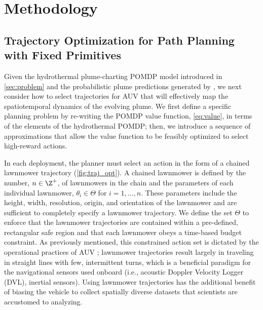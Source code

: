 \section{Methodology}
\subsection{Trajectory Optimization for Path Planning with Fixed Primitives}
\label{sec:to}
Given the hydrothermal plume-charting POMDP model introduced in \cref{sec:problem} and the probabilistic plume predictions generated by \PHUMES, we next consider how to select trajectories for AUV \Sentry that will effectively map the spatiotemporal dynamics of the evolving plume.  We first define a specific planning problem by re-writing the POMDP value function, \cref{eq:value}, in terms of the elements of the hydrothermal POMDP; then, we introduce a sequence of approximations that allow the value function to be feasibly optimized to select high-reward actions.

In each deployment, the planner must select an action in the form of a chained lawnmower trajectory (\cref{fig:traj_opt}). A chained lawnmower is defined by the number, $n \in \Z^+$, of lawnmowers in the chain and the parameters of each individual lawnmower, $\theta_i \in \Theta$ for $i = 1, \dots, n$. These parameters include the height, width, resolution, origin, and orientation of the lawnmower and are sufficient to completely specify a lawnmower trajectory. We define the set $\Theta$ to enforce that the lawnmower trajectories are contained within a pre-defined, rectangular safe region and that each lawnmower obeys a time-based budget constraint. As previously mentioned, this constrained action set is dictated by the operational practices of AUV \Sentry; lawnmower trajectories result largely in \Sentry traveling in straight lines with few, intermittent turns, which is a beneficial paradigm for the navigational sensors used onboard (i.e., acoustic Doppler Velocity Logger (DVL), inertial sensors). Using lawnmower trajectories has the additional benefit of biasing the vehicle to collect spatially diverse datasets that scientists are accustomed to analyzing. 

